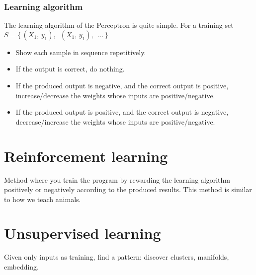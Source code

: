 \documentclass[11pt]{article}
\begin{document}
\subsubsection{Learning algorithm}
\label{sec:orgfec9ec2}
The learning algorithm of the Perceptron is quite simple. For a training set
\(S = \{ \, (X_1,\, y_1),\enspace (X_1,\, y_1),\enspace \hdots \, \}\)
\begin{itemize}
\item Show each sample in sequence repetitively.
\item If the output is correct, do nothing.
\item If the produced output is negative, and the correct output is positive,
increase/decrease the weights whose inputs are positive/negative.
\item If the produced output is positive, and the correct output is negative,
decrease/increase the weights whose inputs are positive/negative.
\end{itemize}
\section{Reinforcement learning}
\label{sec:org021e025}
Method where you train the program by rewarding the learning algorithm positively or
negatively according to the produced results. This method is similar to how we teach
animals.
\section{Unsupervised learning}
\label{sec:org4535cec}
Given only inputs as training, find a pattern: discover clusters, manifolds, embedding.
\end{document}
